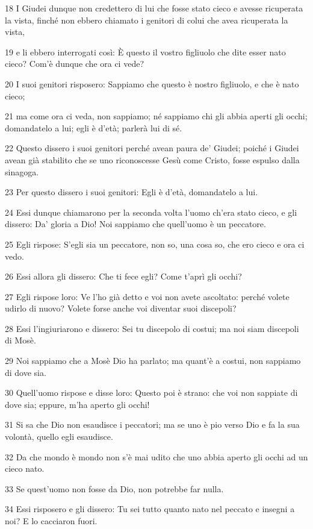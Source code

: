 \par 18 I Giudei dunque non credettero di lui che fosse stato cieco e avesse ricuperata la vista, finché non ebbero chiamato i genitori di colui che avea ricuperata la vista,
\par 19 e li ebbero interrogati così: È questo il vostro figliuolo che dite esser nato cieco? Com'è dunque che ora ci vede?
\par 20 I suoi genitori risposero: Sappiamo che questo è nostro figliuolo, e che è nato cieco;
\par 21 ma come ora ci veda, non sappiamo; né sappiamo chi gli abbia aperti gli occhi; domandatelo a lui; egli è d'età; parlerà lui di sé.
\par 22 Questo dissero i suoi genitori perché avean paura de' Giudei; poiché i Giudei avean già stabilito che se uno riconoscesse Gesù come Cristo, fosse espulso dalla sinagoga.
\par 23 Per questo dissero i suoi genitori: Egli è d'età, domandatelo a lui.
\par 24 Essi dunque chiamarono per la seconda volta l'uomo ch'era stato cieco, e gli dissero: Da' gloria a Dio! Noi sappiamo che quell'uomo è un peccatore.
\par 25 Egli rispose: S'egli sia un peccatore, non so, una cosa so, che ero cieco e ora ci vedo.
\par 26 Essi allora gli dissero: Che ti fece egli? Come t'aprì gli occhi?
\par 27 Egli rispose loro: Ve l'ho già detto e voi non avete ascoltato: perché volete udirlo di nuovo? Volete forse anche voi diventar suoi discepoli?
\par 28 Essi l'ingiuriarono e dissero: Sei tu discepolo di costui; ma noi siam discepoli di Mosè.
\par 29 Noi sappiamo che a Mosè Dio ha parlato; ma quant'è a costui, non sappiamo di dove sia.
\par 30 Quell'uomo rispose e disse loro: Questo poi è strano: che voi non sappiate di dove sia; eppure, m'ha aperto gli occhi!
\par 31 Si sa che Dio non esaudisce i peccatori; ma se uno è pio verso Dio e fa la sua volontà, quello egli esaudisce.
\par 32 Da che mondo è mondo non s'è mai udito che uno abbia aperto gli occhi ad un cieco nato.
\par 33 Se quest'uomo non fosse da Dio, non potrebbe far nulla.
\par 34 Essi risposero e gli dissero: Tu sei tutto quanto nato nel peccato e insegni a noi? E lo cacciaron fuori.
